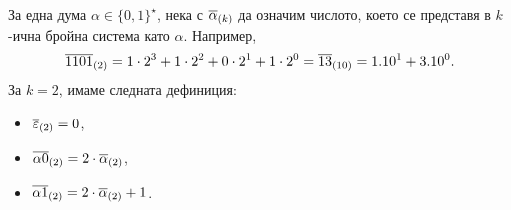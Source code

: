           
          

За една дума $\alpha \in \{0,1\}^\star$, 
нека с $\overline{\alpha}_{(k)}$ да означим числото, което се представя в $k$-ична бройна система като $\alpha$.
Например, 
\[\overline{1101}_{(2)} = 1 \cdot 2^3+1\cdot 2^2+0\cdot 2^1+1\cdot 2^0 = \overline{13}_{(10)} = 1.10^1 + 3.10^0.\]
За $k = 2$, имаме следната дефиниция:
\begin{itemize}
\item
  $\overline{\varepsilon}_{(2)} = 0$,
\item
  $\overline{\alpha 0}_{(2)} = 2\cdot \overline{\alpha}_{(2)}$,
\item
  $\overline{\alpha 1}_{(2)} = 2\cdot \overline{\alpha}_{(2)} + 1$.
\end{itemize}


